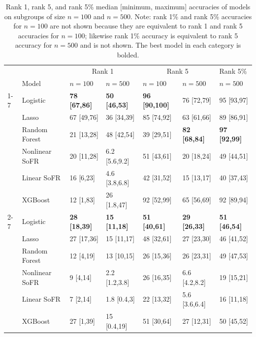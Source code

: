 \begin{table}[H]
\small
\begin{tabular}[t]{lllllll}
\toprule
& & \multicolumn{2}{c}{Rank 1} & \multicolumn{2}{c}{Rank 5}  & Rank 5\%  \\
 & Model & $n=100$ &$n=500$ & $n=100$  &$n=500$  &$n=500$ \\
\cmidrule(lr){1-7}
\multirow{5}{*}{Random} & Logistic & \textbf{78 [67,86]} & \textbf{50 [46,53]} & \textbf{96 [90,100]} & 76 [72,79] &  95 [93,97]\\
& Lasso & 67 [49,76] & 36 [34,39] & 85 [74,92] & 63 [61,66]  & 89 [86,91]\\
 & Random Forest & 21 [13,28] & 48 [42,54] & 39 [29,51] & \textbf{82 [68,84]} &\textbf{97 [92,99]}\\
& Nonlinear SoFR & 20 [11,28] & 6.2 [5.6,9.2] & 51 [43,61] & 20 [18,24]  & 49 [44,51]\\
 & Linear SoFR & 16 [6,23] & 4.6 [3.8,6.8] & 42 [31,52] & 15 [13,17] & 40 [37,43]\\

 & XGBoost & 12 [1,83] & 26 [1.8,47] & 92 [52,99] & 65 [56,69] & 92 [89,94]\\
 \cmidrule(lr){2-7}
\multirow{5}{*}{Temporal} & Logistic & \textbf{28 [18,39]} & \textbf{15 [11,18]} & \textbf{51 [40,61]} &  \textbf{29 [26,33]} & \textbf{51 [46,54]}\\
 & Lasso & 27 [17,36] & 15 [11,17] & 48 [32,61] & 27 [23,30] &  46 [41,52]\\
 & Random Forest &  12 [4,19] & 13 [10,15] & 26 [15,36] & 26 [23,31] & 49 [47,53] \\
 & Nonlinear SoFR &  9 [4,14] & 2.2 [1.2,3.8] & 26 [16,35] &  6.6 [4.2,8.2] & 19 [15,21]\\
 & Linear SoFR & 7 [2,14] & 1.8 [0.4,3] & 22 [13,32] & 5.6 [3.6,6.4] &  16 [11,18]\\
 & XGBoost & 27 [1,39]  & 15 [0.4,19] & 51 [30,64] & 27 [12,31] & 50 [45,52]\\
\bottomrule
\end{tabular}
\caption{Rank 1, rank 5, and rank 5\% median [minimum, maximum] accuracies of models on subgroups of size $n=100$ and $n=500$. Note: rank 1\% and rank 5\% accuracies for $n=100$ are not shown because they are equivalent to rank 1 and rank 5 accuracies for $n=100$; likewise rank 1\% accuracy is equivalent to rank 5 accuracy for $n=500$ and is not shown. The best model in each category is bolded.}
\label{tab:acc100}
\end{table}


